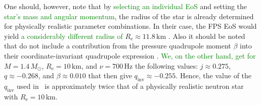 \documentclass{aa}
\newcommand{\refe}[1]{\textcolor{green}{{#1}}}
\newcommand{\refedel}[1]{\textcolor{red}{\sout{#1}}}
\newcommand{\Msun}{\ensuremath{M_{\odot}}}
\newcommand{\qinv}{\ensuremath{q_{\mathrm{inv}}}}
\begin{document}
One should, however, note that by \refe{selecting an individual EoS} and setting the \refe{star's mass and angular momentum}, the radius of the star is already determined for physically realistic parameter combinations.
In their case, the FPS EoS would yield \refe{a considerably different radius of} $R_{\mathrm{e}} \approx 11.8\,\mathrm{km}$ \citep{CST94, LP99}.
Also it should be noted that \citet{BPO13} do not include a contribution from the pressure quadrupole moment $\beta$ into their coordinate-invariant quadrupole expression \citep{PA12}.
\refe{We, on the other hand, get for} $M=1.4\,\Msun$, $R_{\mathrm{e}}=10\,\mathrm{km}$, and $\nu = 700\,\mathrm{Hz}$ the following values: 
$j \approx 0.275$, $q \approx -0.268$, and $\beta \approx 0.010$ that then give $\qinv \approx -0.255$.
Hence, the value of the $\qinv$ used in \citet{BPO13} is approximately twice that of a physically realistic neutron star with $R_{\mathrm{e}} = 10\,\mathrm{km}$.
\end{document}
